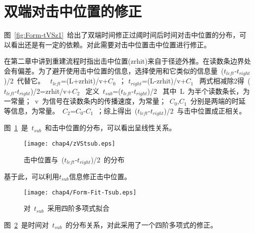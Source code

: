 \section{双端对击中位置的修正}

图~\ref{fig:Form-tVSz1}~给出了双端时间修正过阈时间后时间对击中位置的分布，可以看出还是有一定的依赖。对此需要对击中位置击中位置进行修正。

在第二章中讲到重建流程时指出击中位置(zrhit)来自于径迹外推。在读数条边界处会有偏差。为了避开使用击中位置的信息，选择使用和它类似的信息量~($t_{left}$-$t_{right}$)/2~代替它。
~$t_{left}$=(L+zrhit)/v+$C_{0}$~；
$t_{right}$=(L-zrhit)/v+$C_{1}$~
两式相减除2得~($t_{left}$-$t_{right}$)/2=zrhit/v+$C_{2}$~
定义~$t_{sub}$=($t_{left}$-$t_{right}$)/2~
其中~L~为半个读数条长，为一常量；~v~为信号在读数条内的传播速度，为常量；~$C_{0}$,$C_{1}$~分别是两端的时延等信息，为常量。~$C_{2}$=$C_{0}$-$C_{1}$~；综上得出~($t_{left}$-$t_{right}$)/2~与击中位置成正相关。

图~\ref{fig:zVStsub}~是~$t_{sub}$~和击中位置的分布，可以看出呈线性关系。
\begin{figure}[!h]
\centering
\texttt{[image: chap4/zVStsub.eps]}
\caption{击中位置与~($t_{left}$-$t_{right}$)/2~的分布}
\label{fig:zVStsub}
\end{figure}

基于此，可以利用$t_{sub}$信息修正击中位置。

\begin{figure}[!h]
\centering
\texttt{[image: chap4/Form-Fit-Tsub.eps]}
\caption{对~$t_{sub}$~采用四阶多项式拟合}
\label{fig:Form-Fit-Tsub}
\end{figure}

图~\ref{fig:Form-Fit-Tsub}~是时间对~$t_{sub}$~的分布关系，对此采用了一个四阶多项式的修正。


